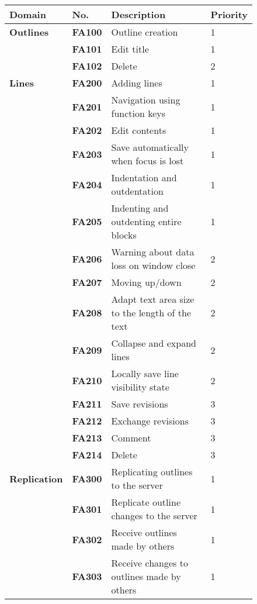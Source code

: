 \medskip
\begin{figure}[H]
  \begin{tabular}{ | l | l | l | l |}
    \hline
    \textbf{Domain} & \textbf{No.} & \textbf{Description} & \textbf{Priority}\\ \hline
    \hline
    \textbf{Outlines} & \textbf{FA100} & Outline creation & 1\\ \hline
    & \textbf{FA101} & Edit title & 1\\ \hline
    & \textbf{FA102} & Delete & 2\\ \hline
    \hline
    \textbf{Lines} & \textbf{FA200} & Adding lines & 1\\ \hline
    & \textbf{FA201} & Navigation using function keys & 1\\ \hline
    & \textbf{FA202} & Edit contents & 1\\ \hline
    & \textbf{FA203} & Save automatically when focus is lost & 1\\ \hline
    & \textbf{FA204} & Indentation and outdentation & 1\\ \hline
    & \textbf{FA205} & Indenting and outdenting entire blocks & 1\\ \hline
    & \textbf{FA206} & Warning about data loss on window close & 2\\ \hline
    & \textbf{FA207} & Moving up/down & 2\\ \hline
    & \textbf{FA208} & Adapt text area size to the length of the text & 2\\ \hline
    & \textbf{FA209} & Collapse and expand lines & 2\\ \hline
    & \textbf{FA210} & Locally save line visibility state & 2\\ \hline
    & \textbf{FA211} & Save revisions & 3\\ \hline
    & \textbf{FA212} & Exchange revisions & 3\\ \hline
    & \textbf{FA213} & Comment & 3\\ \hline
    & \textbf{FA214} & Delete & 3\\ \hline
    \hline
    \textbf{Replication} & \textbf{FA300} & Replicating outlines to the server & 1\\ \hline
    & \textbf{FA301} & Replicate outline changes to the server & 1\\ \hline
    & \textbf{FA302} & Receive outlines made by others & 1\\ \hline
    & \textbf{FA303} & Receive changes to outlines made by others & 1\\ \hline

\end{tabular}
\end{figure}
